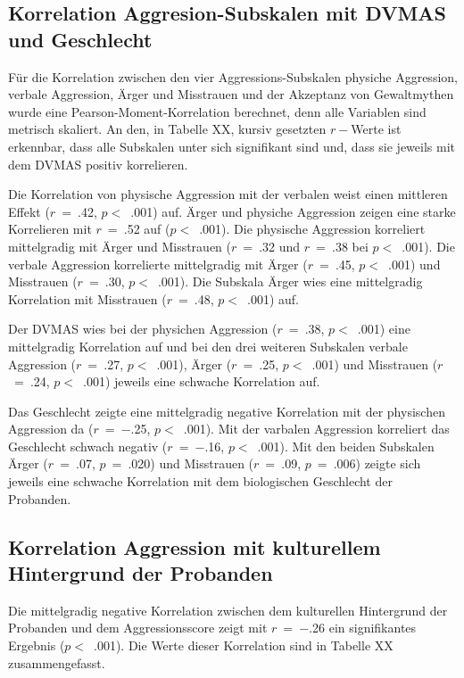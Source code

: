 \subsection{Korrelation Aggresion-Subskalen mit DVMAS und Geschlecht}  \label{subsec_4.4.1}
Für die Korrelation zwischen den vier Aggressions-Subskalen physiche Aggression, verbale Aggression, Ärger und Misstrauen und der Akzeptanz von Gewaltmythen wurde eine Pearson-Moment-Korrelation berechnet, denn alle Variablen sind metrisch skaliert. An den, in Tabelle XX, kursiv gesetzten $r-$Werte ist erkennbar, dass alle Subskalen unter sich signifikant sind und, dass sie jeweils mit dem DVMAS positiv korrelieren. 

Die Korrelation von physische Aggression mit der verbalen weist einen mittleren Effekt ($r$~=~.42, $p<$~.001) auf. Ärger und physiche Aggression zeigen eine starke Korrelieren mit $r$~=~.52 auf ($p<$~.001). Die physische Aggression korreliert mittelgradig mit Ärger und Misstrauen ($r$~=~.32 und $r$~=~.38 bei $p<$~.001).
Die verbale Aggression korrelierte mittelgradig mit Ärger ($r$~=~.45, $p<$~.001) und Misstrauen ($r$~=~.30, $p<$~.001).
Die Subskala Ärger wies eine mittelgradig Korrelation mit Misstrauen ($r$~=~.48, $p<$~.001) auf.

Der DVMAS wies bei der physichen Aggression ($r$~=~.38, $p<$~.001) eine mittelgradig Korrelation auf und bei den drei weiteren Subskalen verbale Aggression ($r$~=~.27, $p<$~.001), Ärger ($r$~=~.25, $p<$~.001) und Misstrauen ($r$~=~.24, $p<$~.001) jeweils eine schwache Korrelation auf.

Das Geschlecht zeigte eine mittelgradig negative Korrelation mit der physischen Aggression da ($r$~=~$-$.25, $p<$~.001). Mit der varbalen Aggression korreliert das Geschlecht schwach negativ ($r$~=~$-$.16, $p<$~.001). Mit den beiden Subskalen Ärger ($r$~=~.07, $p$~=~.020) und Misstrauen ($r$~=~.09, $p$~=~.006) zeigte sich jeweils eine schwache Korrelation mit dem biologischen Geschlecht der Probanden.


\subsection{Korrelation Aggression mit kulturellem Hintergrund der Probanden}   \label{subsec_4.4.2}
Die mittelgradig negative Korrelation zwischen dem kulturellen Hintergrund der Probanden und dem Aggressionsscore zeigt mit $r$~=~$-$.26 ein signifikantes Ergebnis ($p<$~.001). Die Werte dieser Korrelation sind in Tabelle XX zusammengefasst.


